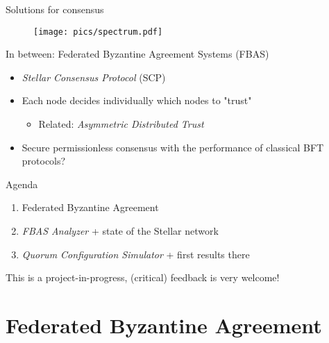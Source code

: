 \documentclass{beamer}
\begin{document}
\begin{frame}{Solutions for consensus}
  \begin{figure}[htpb]
    \centering
    \texttt{[image: pics/spectrum.pdf]}
  \end{figure}
  \vfill
  \vfill
    In between: \alert{Federated Byzantine Agreement Systems} (FBAS)
    \begin{itemize}
      \item \emph{Stellar Consensus Protocol} (SCP) \cite{mazieres2015stellar}
      \item Each node \alert{decides individually which nodes to "trust"}
        \begin{itemize}
          \item Related: \emph{Asymmetric Distributed Trust} \cite{cachin2019asymmetric}
        \end{itemize}
      \vfill
      \item Secure permissionless consensus with the performance of classical BFT protocols?
    \end{itemize}
\end{frame}

\begin{frame}{Agenda}
  \begin{enumerate}
    \item Federated Byzantine Agreement
    \item \emph{FBAS Analyzer} + state of the Stellar network
    \item \emph{Quorum Configuration Simulator} + first results there
  \end{enumerate}
  \vfill
  This is a project-in-progress, (critical) feedback is very welcome!
\end{frame}

\section{Federated Byzantine Agreement}

\end{document}
